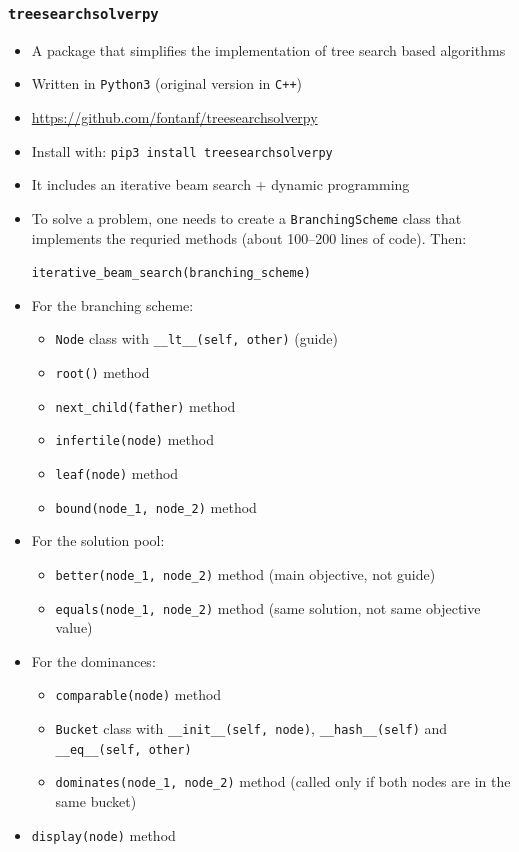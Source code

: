 \documentclass[10pt]{beamer}
\begin{document}
\begin{frame}
  \frametitle{\texttt{treesearchsolverpy}}

  \begin{itemize}
    \item A package that simplifies the implementation of tree search based algorithms
    \item Written in \texttt{Python3} (original version in \texttt{C++})
    \item \url{https://github.com/fontanf/treesearchsolverpy}
    \item Install with: \texttt{pip3 install treesearchsolverpy}
    \item It includes an iterative beam search + dynamic programming
    \item To solve a problem, one needs to create a \texttt{BranchingScheme} class that implements the requried methods (about 100--200 lines of code). Then:

      \texttt{iterative\_beam\_search(branching\_scheme)}
  \end{itemize}
\end{frame}

\begin{frame}
  \begin{itemize}
    \item For the branching scheme:
      \begin{itemize}
        \item \texttt{Node} class with \texttt{\_\_lt\_\_(self, other)} (guide)
        \item \texttt{root()} method
        \item \texttt{next\_child(father)} method
        \item \texttt{infertile(node)} method
        \item \texttt{leaf(node)} method
        \item \texttt{bound(node\_1, node\_2)} method
      \end{itemize}
    \item For the solution pool:
      \begin{itemize}
        \item \texttt{better(node\_1, node\_2)} method (main objective, not guide)
        \item \texttt{equals(node\_1, node\_2)} method (same solution, not same objective value)
      \end{itemize}
    \item For the dominances:
      \begin{itemize}
        \item \texttt{comparable(node)} method
        \item \texttt{Bucket} class with \texttt{\_\_init\_\_(self, node)}, \texttt{\_\_hash\_\_(self)} and \texttt{\_\_eq\_\_(self, other)}
        \item \texttt{dominates(node\_1, node\_2)} method (called only if both nodes are in the same bucket)
      \end{itemize}
    \item \texttt{display(node)} method
  \end{itemize}
\end{frame}
\end{document}
